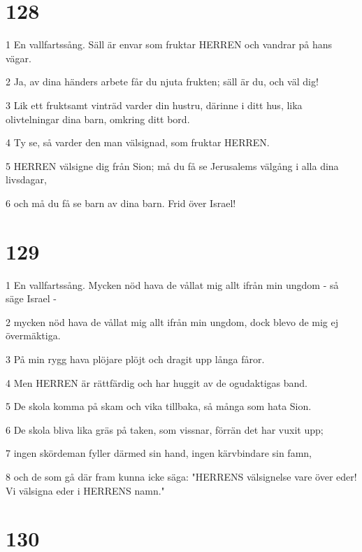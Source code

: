 \chapter{128}

\par 1 En vallfartssång. Säll är envar som fruktar HERREN och vandrar på hans vägar.
\par 2 Ja, av dina händers arbete får du njuta frukten; säll är du, och väl dig!
\par 3 Lik ett fruktsamt vinträd varder din hustru, därinne i ditt hus, lika olivtelningar dina barn, omkring ditt bord.
\par 4 Ty se, så varder den man välsignad, som fruktar HERREN.
\par 5 HERREN välsigne dig från Sion; må du få se Jerusalems välgång i alla dina livsdagar,
\par 6 och må du få se barn av dina barn. Frid över Israel!

\chapter{129}

\par 1 En vallfartssång. Mycken nöd hava de vållat mig allt ifrån min ungdom - så säge Israel -
\par 2 mycken nöd hava de vållat mig allt ifrån min ungdom, dock blevo de mig ej övermäktiga.
\par 3 På min rygg hava plöjare plöjt och dragit upp långa fåror.
\par 4 Men HERREN är rättfärdig och har huggit av de ogudaktigas band.
\par 5 De skola komma på skam och vika tillbaka, så många som hata Sion.
\par 6 De skola bliva lika gräs på taken, som vissnar, förrän det har vuxit upp;
\par 7 ingen skördeman fyller därmed sin hand, ingen kärvbindare sin famn,
\par 8 och de som gå där fram kunna icke säga: "HERRENS välsignelse vare över eder! Vi välsigna eder i HERRENS namn."

\chapter{130}

